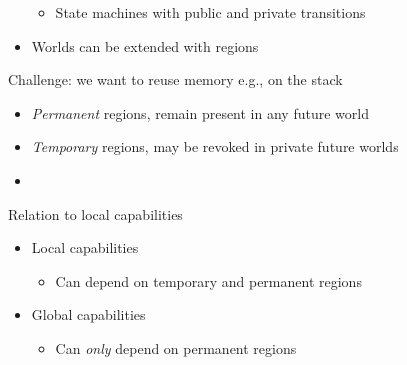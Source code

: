 \documentclass{beamer}
\begin{document}
\begin{frame}
\begin{overprint}
\begin{itemize}
      \begin{itemize}
      \item State machines with public and private transitions
      \end{itemize}
    \item<3-> Worlds can be extended with regions
    \end{itemize}
    Challenge: we want to reuse memory e.g., on the stack
      \begin{itemize}[<5-8>]
      \item \emph{Permanent} regions, remain present in any future world
      \item \emph{Temporary} regions, may be revoked in private future worlds
      \item {}
      \end{itemize}
    Relation to local capabilities
    \begin{itemize}
    \item<9-> Local capabilities
      \begin{itemize}
      \item Can depend on temporary and permanent regions
      \end{itemize}
    \item<10-> Global capabilities
      \begin{itemize}
      \item Can \emph{only} depend on permanent regions
      \end{itemize}
    \end{itemize}
  \end{overprint}
\end{frame}
\end{document}
